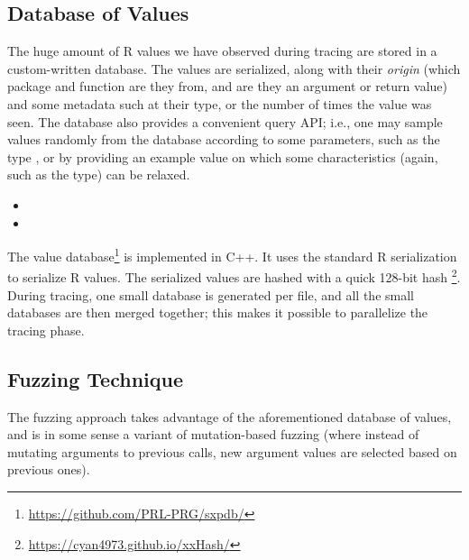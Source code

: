 \documentclass[sigplan,anonymous,review]{acmart}
\begin{document}

\subsection{Database of Values}

The huge amount of R values we have observed during tracing are stored in a custom-written database. 
The values are serialized, along with their \textit{origin} (which package and function are they from, and are they an argument or return value) and some metadata such at their type, or the number of times the value was seen. 
The database also provides a convenient query API; i.e., one may sample values randomly from the database according to some parameters, such as the type , or by providing an example value on which some characteristics (again, such as the type) can be relaxed.

\begin{itemize}
    \item {}
    \item {}
\end{itemize}

The value database\footnote{\url{https://github.com/PRL-PRG/sxpdb/}  } is implemented in C++. 
It uses the standard R serialization to serialize R values. 
The serialized values are hashed with a quick 128-bit hash \footnote{\url{https://cyan4973.github.io/xxHash/}}. 
During tracing, one small database is generated per file, and all the small databases are then merged together; this makes it possible to parallelize the tracing phase.

\subsection{Fuzzing Technique}


The fuzzing approach takes advantage of the aforementioned database of values, and is in some sense a variant of mutation-based fuzzing (where instead of mutating arguments to previous calls, new argument values are selected based on previous ones).
\end{document}
